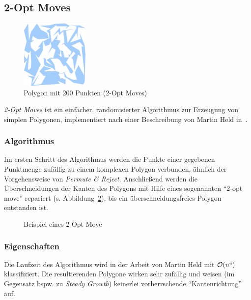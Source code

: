 \subsection{2-Opt Moves}

\begin{figure}[h]
\begin{center}
\includegraphics[width=0.3\textwidth]{img/2opt200.eps}
\end{center}
\caption{Polygon mit 200 Punkten (2-Opt Moves)}
\label{fig:2opt200}
\end{figure}

\emph{2-Opt Moves} ist ein einfacher, randomisierter Algorithmus zur Erzeugung von simplen Polygonen, implementiert nach einer Beschreibung von Martin Held in~\cite{held98polygons}. 
\subsubsection{Algorithmus}
Im ersten Schritt des Algorithmus werden die Punkte einer gegebenen Punktmenge zufällig zu einem komplexen Polygon verbunden, ähnlich der Vorgehensweise von \emph{Permute \& Reject}. Anschließend werden die Überschneidungen der Kanten des Polygons mit Hilfe eines sogenannten \enquote{2-opt move} repariert (s. Abbildung~\ref{fig:2optmove}), bis ein überschneidungsfreies Polygon entstanden ist.

\begin{figure}[h]
\begin{center}
\end{center}
\caption{Beispiel eines 2-Opt Move}
\label{fig:2optmove}
\end{figure}

\subsubsection{Eigenschaften}
Die Laufzeit des Algorithmus wird in der Arbeit von Martin Held mit $\mathcal{O}(n^4)$ klassifiziert. Die resultierenden Polygone wirken sehr zufällig und weisen (im Gegensatz bspw. zu \emph{Steady Growth}) keinerlei vorherrschende \enquote{Kantenrichtung} auf.